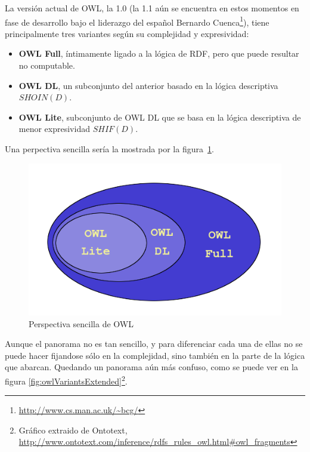 La versión actual de OWL, la 1.0 (la 1.1 aún se encuentra en estos momentos en 
fase de desarrollo bajo el liderazgo del español Bernardo 
Cuenca\footnote{\url{http://www.cs.man.ac.uk/~bcg/}}), tiene principalmente 
tres variantes según su complejidad y expresividad:

\begin{itemize}
  \item \textbf{OWL Full}, íntimamente ligado a la lógica de RDF, pero que puede 
	resultar no computable.
  \item \textbf{OWL DL}, un subconjunto del anterior basado en la lógica 
	descriptiva ${SHOIN} (D)$.
  \item \textbf{OWL Lite}, subconjunto de OWL DL que se basa en la lógica 
	descriptiva de menor expresividad ${SHIF} (D)$.
\end{itemize}

Una perpectiva sencilla sería la mostrada por la figura~\ref{fig:owlVariants}.

\begin{figure}[H]
	\centering
	\includegraphics[width=12cm]{images/owl-variants.png}
	\caption{Perspectiva sencilla de OWL}
	\label{fig:owlVariants}
\end{figure}

Aunque el panorama no es tan sencillo, y para diferenciar cada una de ellas no
se puede hacer fijandose sólo en la complejidad, sino también en la parte de la 
lógica que abarcan. Quedando un panorama aún más confuso, como se puede ver en 
la figura \ref{fig:owlVariantsExtended}\footnote{Gráfico extraido de Ontotext, 
\url{http://www.ontotext.com/inference/rdfs_rules_owl.html#owl_fragments}}.

